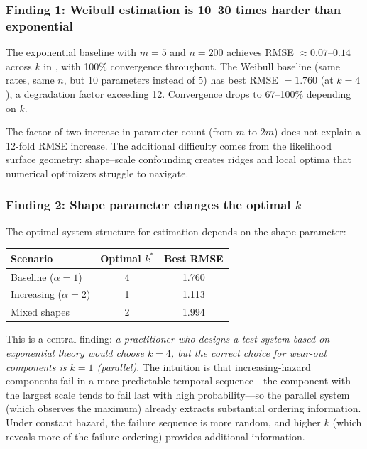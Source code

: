 \documentclass[12pt]{article}
\theoremstyle{definition}
\theoremstyle{remark}
\begin{document}
\subsubsection{Finding 1: Weibull estimation is 10--30 times harder
  than exponential}
\label{sec:finding1}

The exponential baseline with $m = 5$ and $n = 200$ achieves
RMSE $\approx 0.07\text{--}0.14$ across $k$ in
\citet{Towell2026}, with 100\% convergence throughout.  The
Weibull baseline (same rates, same $n$, but 10 parameters instead
of 5) has best RMSE $= 1.760$ (at $k = 4$), a degradation factor
exceeding 12.  Convergence drops to 67--100\% depending on $k$.

The factor-of-two increase in parameter count (from $m$ to $2m$)
does not explain a 12-fold RMSE increase.  The additional
difficulty comes from the likelihood surface geometry:
shape--scale confounding creates ridges and local optima that
numerical optimizers struggle to navigate.

\subsubsection{Finding 2: Shape parameter changes the optimal \texorpdfstring{$k$}{k}}
\label{sec:sim-optimal-k}

The optimal system structure for estimation depends on the shape
parameter:
\begin{center}
\begin{tabular}{lcc}
\toprule
Scenario & Optimal $k^*$ & Best RMSE \\
\midrule
Baseline ($\alpha = 1$) & 4 & 1.760 \\
Increasing ($\alpha = 2$) & 1 & 1.113 \\
Mixed shapes & 2 & 1.994 \\
\bottomrule
\end{tabular}
\end{center}

This is a central finding: \emph{a practitioner who designs a test
system based on exponential theory would choose $k = 4$, but the
correct choice for wear-out components is $k = 1$ (parallel)}.
The intuition is that increasing-hazard components fail in a more
predictable temporal sequence---the component with the largest scale
tends to fail last with high probability---so the parallel system
(which observes the maximum) already extracts substantial ordering
information.  Under constant hazard, the failure sequence is more
random, and higher $k$ (which reveals more of the failure ordering)
provides additional information.
\end{document}
